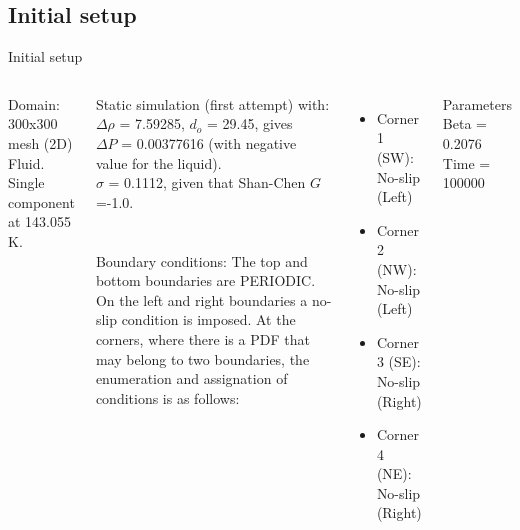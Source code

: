 \documentclass[8pt]{beamer}
\begin{document}
	\subsection{Initial setup}
	\begin{frame}[t]{Initial setup}
		\justifying
		\begin{columns}[t]
			
			Domain: 300x300 mesh (2D)\\
			Fluid. Single component at 143.055 K. 
			
			
			Static simulation (first attempt) with:\\ $\Delta \rho $ = 7.59285, $d_o$ = 29.45, gives \\$\Delta P$ = 0.00377616 (with negative value for the liquid). \\$\sigma$ = 0.1112, given that Shan-Chen $G$=-1.0.\\~\\
			~\\
			Boundary conditions: The top and bottom boundaries are PERIODIC. On the left and right boundaries a no-slip condition is imposed. At the corners, where there is a PDF that may belong to two boundaries, the enumeration and assignation of conditions is as follows:
			\begin{itemize}
				\item Corner 1 (SW): No-slip (Left)
				\item Corner 2 (NW): No-slip (Left)
				\item Corner 3 (SE): No-slip (Right)
				\item Corner 4 (NE): No-slip (Right)
			\end{itemize}
		

			
			
			
			Parameters\\
			Beta = 0.2076\\
			Time = 100000
		\end{columns}
	\end{frame}

\end{document}
